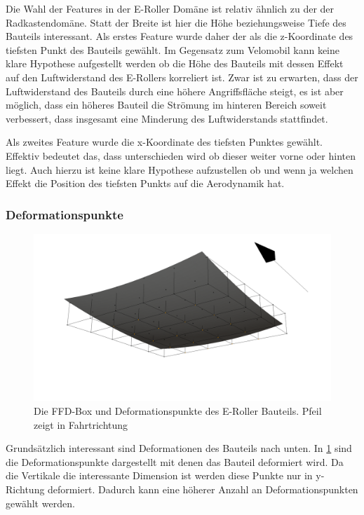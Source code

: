Die Wahl der Features in der E-Roller Domäne ist relativ ähnlich zu der der Radkastendomäne.
Statt der Breite ist hier die Höhe beziehungsweise Tiefe des Bauteils interessant.
Als erstes Feature wurde daher der als die z-Koordinate des tiefsten Punkt des Bauteils gewählt.
Im Gegensatz zum Velomobil kann keine klare Hypothese aufgestellt werden ob die Höhe des Bauteils mit dessen Effekt auf den Luftwiderstand des E-Rollers korreliert ist.
Zwar ist zu erwarten, dass der Luftwiderstand des Bauteils durch eine höhere Angriffsfläche steigt, es ist aber möglich, dass ein höheres Bauteil die Strömung im hinteren Bereich soweit verbessert, dass insgesamt eine Minderung des Luftwiderstands stattfindet.

Als zweites Feature wurde die x-Koordinate des tiefsten Punktes gewählt.
Effektiv bedeutet das, dass unterschieden wird ob dieser weiter vorne oder hinten liegt.
Auch hierzu ist keine klare Hypothese aufzustellen ob und wenn ja welchen Effekt die Position des tiefsten Punkts auf die Aerodynamik hat.

\subsubsection{Deformationspunkte}
\begin{figure}[h]
	\centering
	\includegraphics[width=.8\linewidth]{bilder/escooter_deformationPoints}
	\caption{Die FFD-Box und Deformationspunkte des E-Roller Bauteils. Pfeil zeigt in Fahrtrichtung}
	\label{fig:escooter_deformation}
\end{figure}
Grundsätzlich interessant sind Deformationen des Bauteils nach unten.
In \cref{fig:escooter_deformation} sind die Deformationspunkte dargestellt mit denen das Bauteil deformiert wird.
Da die Vertikale die interessante Dimension ist werden diese Punkte nur in y-Richtung deformiert.
Dadurch kann eine höherer Anzahl an Deformationspunkten gewählt werden.






